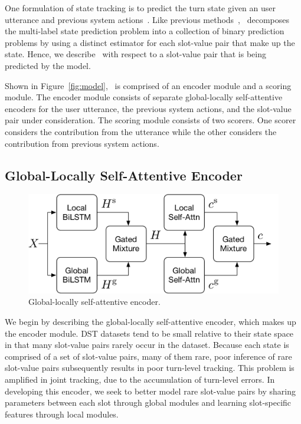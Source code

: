 \documentclass[11pt,a4paper]{article}
\begin{document}
One formulation of state tracking is to predict the turn state given an user utterance and previous system actions~\citep{williams2007partially}.
Like previous methods~\citep{henderson2014word,wen2017NetworkBasedEndToEndDialogueSystem,mrkvsic2016neural}, \modelnameshort~decomposes the multi-label state prediction problem into a collection of binary prediction problems by using a distinct estimator for each slot-value pair that make up the state.
Hence, we describe \modelnameshort~with respect to a slot-value pair that is being predicted by the model.

Shown in Figure~\ref{fig:model}, \modelnameshort~is comprised of an encoder module and a scoring module.
The encoder module consists of separate global-locally self-attentive encoders for the user utterance, the previous system actions, and the slot-value pair under consideration.
The scoring module consists of two scorers.
One scorer considers the contribution from the utterance while the other considers the contribution from previous system actions.










\subsection{Global-Locally Self-Attentive Encoder}


\begin{figure}[t]
\centering
\includegraphics[width=\linewidth]{figures/share.pdf}
\caption{
Global-locally self-attentive encoder.
}
\label{fig:share}
\end{figure}





We begin by describing the global-locally self-attentive encoder, which makes up the encoder module.
DST datasets tend to be small relative to their state space in that many slot-value pairs rarely occur in the dataset.
Because each state is comprised of a set of slot-value pairs, many of them rare, poor inference of rare slot-value pairs subsequently results in poor turn-level tracking.
This problem is amplified in joint tracking, due to the accumulation of turn-level errors.
In developing this encoder, we seek to better model rare slot-value pairs by sharing parameters between each slot through global modules and learning slot-specific features through local modules.
\end{document}
